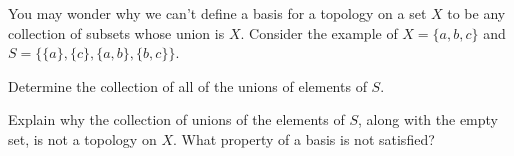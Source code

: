 \label{sec_top_space_exer}

\be

\item You may wonder why we can't define a basis for a topology on a set $X$ to be any collection of subsets whose union is $X$. Consider the example of $X = \{a,b,c\}$ and $S = \{\{a\}, \{c\}, \{a,b\}, \{b,c\}\}$. 

\ba
\item Determine the collection of all of the unions of elements of $S$.

\item Explain why the collection of unions of the elements of $S$, along with the empty set, is not a topology on $X$. What property of a basis is not satisfied?

\ea

